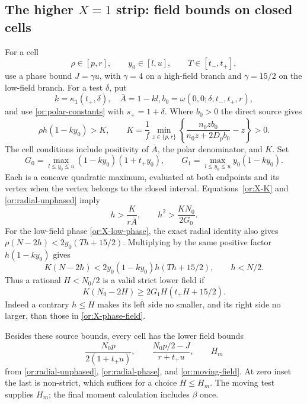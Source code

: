 \subsection{The higher $X=1$ strip: field bounds on closed cells}

For a cell
\begin{equation}\label{or:X-cell}
       \rho\in[p,r],\qquad y_0\in[l,u],\qquad T\in[t_-,t_+],
\end{equation}
use a phase bound $J=\gamma u$, with $\gamma=4$ on a
high-field branch and $\gamma=15/2$ on the low-field branch.
For a test $\delta$, put
\[
 k=\kappa_1(t_+,\delta),\quad \overline A=1-kl,
 b_0=\omega(0,0;\delta,t_-,t_+,r),
\]
and use \eqref{or:polar-constants} with $s_+=1+\delta$.
Where $b_0>0$ the direct source gives
\begin{equation}\label{or:X-K}
 \rho h(1-ky_0)>K,\qquad
 K=\frac1f\min_{z\in\{p,r\}}
          \left\{\frac{n_0z b_0}{n_0z+2D_pb_0}-z\right\}>0.
\end{equation}
The cell conditions include positivity of $\overline A$, the polar
denominator, and $K$.  Set
\[
 G_0=\max_{l\le y_0\le u}(1-ky_0)(1+t_+y_0),\qquad
 G_1=\max_{l\le y_0\le u}y_0(1-ky_0).
\]
Each is a concave quadratic maximum, evaluated at both endpoints
and its vertex when the vertex belongs to the closed interval.
Equations~\eqref{or:X-K} and \eqref{or:radial-unphased} imply
\begin{equation}\label{or:X-source-fields}
             h>\frac{K}{r\overline A},\qquad
             h^2>\frac{KN_0}{2G_0}.
\end{equation}
For the low-field phase \eqref{or:X-low-phase}, the exact radial
identity also gives
$\rho(N-2h)<2y_0(Th+15/2)$.
Multiplying by the same positive factor $h(1-ky_0)$ gives
\[
          K(N-2h)<2y_0(1-ky_0)h(Th+15/2),\qquad h<N/2.
\]
Thus a rational $H<N_0/2$ is a valid strict lower field if
\begin{equation}\label{or:X-phase-field}
                   K(N_0-2H)\ge2G_1H(t_+H+15/2).
\end{equation}
Indeed a contrary $h\le H$ makes its left side no smaller, and its
right side no larger, than those in \eqref{or:X-phase-field}.

Besides these source bounds, every cell has the lower field bounds
\begin{equation}\label{or:X-radial-fields}
 \frac{N_0p}{2(1+t_+u)},\qquad
 \frac{N_0p/2-J}{r+t_+u},\qquad H_m
\end{equation}
from \eqref{or:radial-unphased}, \eqref{or:radial-phase}, and
\eqref{or:moving-field}.  At zero inset the last is non-strict,
which suffices for a choice $H\le H_m$.  The moving test supplies
$H_m$; the final moment calculation includes $\beta$ once.

